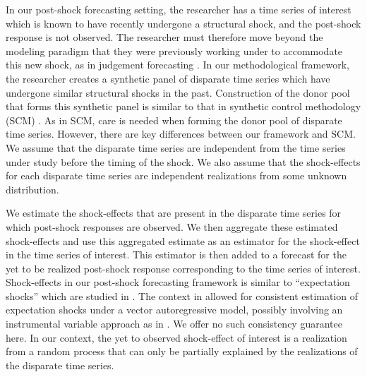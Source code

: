 \documentclass[11pt]{article}
\theoremstyle{definition}
\begin{document}
In our post-shock forecasting setting, the researcher has a time series of interest which is known to have recently undergone a structural shock, and the post-shock response is not observed. The researcher must therefore move beyond the modeling paradigm that they were previously working under to accommodate this new shock, as in judgement forecasting \citep{monti2008forecast, svensson2005monetary}. In our methodological framework, the researcher creates a synthetic panel of disparate time series which have undergone similar structural shocks in the past. Construction of the donor pool that forms this synthetic panel is similar to that in synthetic control methodology (SCM) \citep{abadie2010synthetic}. As in SCM, care is needed when forming the donor pool of disparate time series. However, there are key differences between our framework and SCM. We assume that the disparate time series are independent from the time series under study before the timing of the shock. We also assume that the shock-effects for each disparate time series are independent realizations from some unknown distribution. 

We estimate the shock-effects that are present in the disparate time series for which post-shock responses are observed. We then aggregate these estimated shock-effects and use this aggregated estimate as an estimator for the shock-effect in the time series of interest. This estimator is then added to a forecast for the yet to be realized post-shock response corresponding to the time series of interest. Shock-effects in our post-shock forecasting framework is similar to ``expectation shocks'' which are studied in \cite{clements2019measuring}. The context in \cite{clements2019measuring} allowed for consistent estimation of expectation shocks under a vector autoregressive model, possibly involving an instrumental variable approach as in \cite{croushore2006data}. We offer no such consistency guarantee here. In our context, the yet to observed shock-effect of interest is a realization from a random process that can only be partially explained by the realizations of the disparate time series. 



\end{document}
